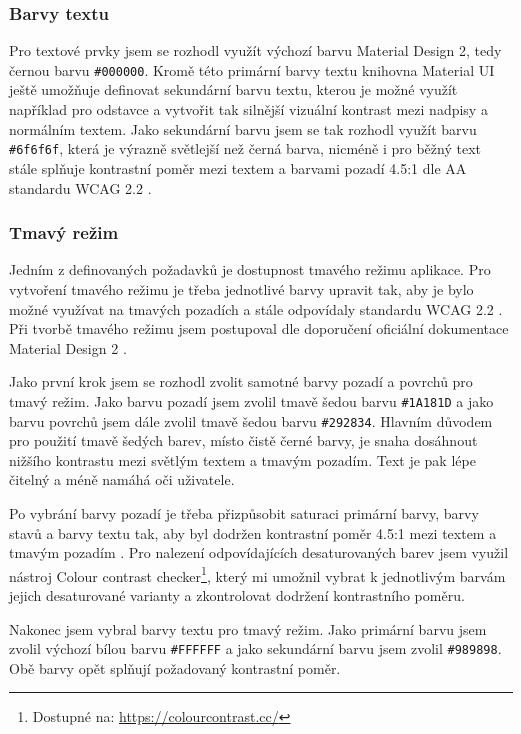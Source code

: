 \subsubsection{Barvy textu}

Pro textové prvky jsem se rozhodl využít výchozí barvu Material Design 2, tedy černou barvu \texttt{\#000000}. Kromě této primární barvy textu knihovna Material UI ještě umožňuje definovat sekundární barvu textu, kterou je možné využít například pro odstavce a vytvořit tak silnější vizuální kontrast mezi nadpisy a normálním textem. Jako sekundární barvu jsem se tak rozhodl využít barvu \texttt{\#6f6f6f}, která je výrazně světlejší než černá barva, nicméně i pro běžný text stále splňuje kontrastní poměr mezi textem a barvami pozadí 4.5:1 dle AA standardu WCAG 2.2 \cite{WCAG22}.  

\subsubsection{Tmavý režim}

Jedním z definovaných požadavků je dostupnost tmavého režimu aplikace. Pro vytvoření tmavého režimu je třeba jednotlivé barvy upravit tak, aby je bylo možné využívat na tmavých pozadích a stále odpovídaly standardu WCAG 2.2 \cite{WCAG22}. Při tvorbě tmavého režimu jsem postupoval dle doporučení oficiální dokumentace Material Design 2 \cite{MaterialDesign2DarkTheme}.

Jako první krok jsem se rozhodl zvolit samotné barvy pozadí a povrchů pro tmavý režim. Jako barvu pozadí jsem zvolil tmavě šedou barvu \texttt{\#1A181D} a jako barvu povrchů jsem dále zvolil tmavě šedou barvu \texttt{\#292834}. Hlavním důvodem pro použití tmavě šedých barev, místo čistě černé barvy, je snaha dosáhnout nižšího kontrastu mezi světlým textem a tmavým pozadím. Text je pak lépe čitelný a méně namáhá oči uživatele. \cite{MaterialDesign2DarkTheme}

Po vybrání barvy pozadí je třeba přizpůsobit saturaci primární barvy, barvy stavů a barvy textu tak, aby byl dodržen kontrastní poměr 4.5:1 mezi textem a tmavým pozadím \cite{WCAG22}. Pro nalezení odpovídajících desaturovaných barev jsem využil nástroj Colour contrast checker\footnote{Dostupné na: \href{https://colourcontrast.cc/}{https://colourcontrast.cc/}}, který mi umožnil vybrat k jednotlivým barvám jejich desaturované varianty a zkontrolovat dodržení kontrastního poměru.

Nakonec jsem vybral barvy textu pro tmavý režim. Jako primární barvu jsem zvolil výchozí bílou barvu \texttt{\#FFFFFF} a jako sekundární barvu jsem zvolil \texttt{\#989898}. Obě barvy opět splňují požadovaný kontrastní poměr.

